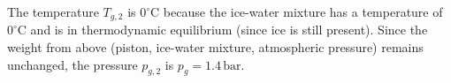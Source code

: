 The temperature \( T_{g,2} \) is \( 0^\circ \text{C} \) because the ice-water mixture has a temperature of \( 0^\circ \text{C} \) and is in thermodynamic equilibrium (since ice is still present).  
Since the weight from above (piston, ice-water mixture, atmospheric pressure) remains unchanged, the pressure \( p_{g,2} \) is \( p_{g} = 1.4 \, \text{bar} \).
